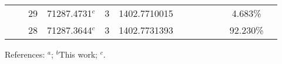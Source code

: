 \begin{table*}
\begin{center}
{\begin{tabular}{:l;l;c;l;c;l;c;l;l;c;c;c;c}
\rowstyle{\itshape}               &        & 29        & 71287.4731$^{c}$                 & 3 &  1402.7710015      &      & $                                        $ & $                                        $ & $      $ &              & 4.683\%   & $          $\\
\rowstyle{\itshape}               &        & 28        & 71287.3644$^{c}$                 & 3 &  1402.7731393      &      & $                                        $ & $                                        $ & $      $ &              & 92.230\%  & $          $\\
\hline
\end{tabular}
}
{\footnotesize References:
$^{a}$\citet{Griesmann:2000:L113};
$^{b}$This work;
$^{c}$\citet{Berengut:2003:022502}.}
\end{center}
\end{table*}
